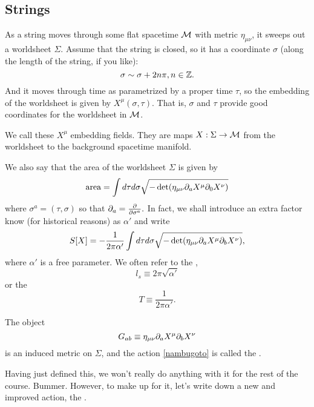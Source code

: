 \subsection*{Strings} As a string moves through some flat spacetime $\mathcal{M}$ with metric $\eta_{\mu\nu}$, it sweeps out a worldsheet $\Sigma.$ Assume that the string is closed, so it has a coordinate $\sigma$ (along the length of the string, if you like):
\begin{equation*}
    \sigma \sim \sigma + 2n\pi, n\in \mathbb{Z}.
\end{equation*}
And it moves through time as parametrized by a proper time $\tau$, so the embedding of the worldsheet is given by $X^\mu(\sigma,\tau)$. That is, $\sigma$ and $\tau$ provide good coordinates for the worldsheet in $\mathcal{M}$.
\begin{defn}
    We call these $X^\mu$ embedding fields. They are maps
    $X:\Sigma \to \mathcal{M}$ from the worldsheet to the background spacetime manifold.
\end{defn}
We also say that the area of the worldsheet $\Sigma$ is given by
\begin{equation}
    \text{area}=\int d\tau d\sigma \sqrt{-\det(\eta_{\mu\nu} \partial_a X^\mu \partial_0 X^\nu)}
\end{equation}
where $\sigma^a =(\tau, \sigma)$ so that $\partial_a = \frac{\partial }{\partial \sigma^a}.$ In fact, we shall introduce an extra factor know (for historical reasons) as $\alpha'$ and write
\begin{equation}\label{nambugoto}
    S[X]=-\frac{1}{2\pi \alpha'}\int d\tau d\sigma \sqrt{-\det(\eta_{\mu\nu} \partial_a X^\mu \partial_b X^\nu)},
\end{equation}
where $\alpha'$ is a free parameter. We often refer to the ,
\begin{equation}
    l_s \equiv 2\pi\sqrt{\alpha'}
\end{equation}
or the 
\begin{equation}
    T \equiv \frac{1}{2\pi \alpha'}.
\end{equation}

\begin{defn}
    The object
    \begin{equation}
        G_{ab}\equiv \eta_{\mu\nu} \partial_a X^\mu \partial_b X^\nu
    \end{equation}
    is an induced metric on $\Sigma$, and the action \ref{nambugoto} is called the .
\end{defn}
Having just defined this, we won't really do anything with it for the rest of the course. Bummer. However, to make up for it, let's write down a new and improved action, the .

